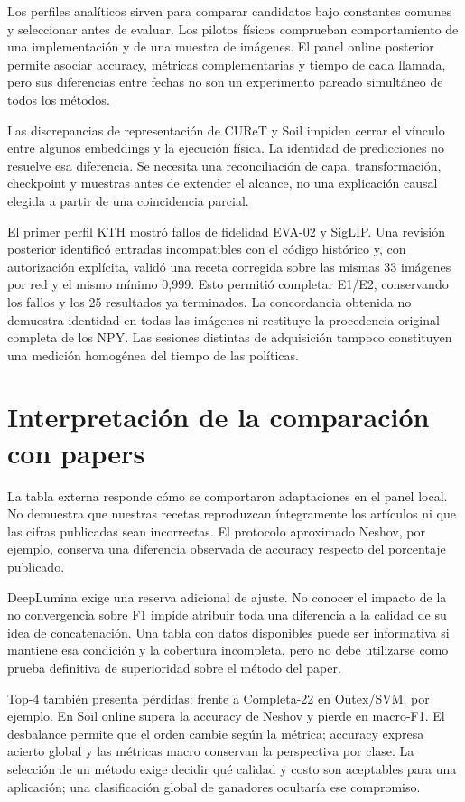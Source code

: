 Los perfiles analíticos sirven para comparar candidatos bajo constantes comunes y seleccionar antes de evaluar. Los pilotos físicos comprueban comportamiento de una implementación y de una muestra de imágenes. El panel online posterior permite asociar accuracy, métricas complementarias y tiempo de cada llamada, pero sus diferencias entre fechas no son un experimento pareado simultáneo de todos los métodos.

Las discrepancias de representación de CUReT y Soil impiden cerrar el vínculo entre algunos embeddings y la ejecución física. La identidad de predicciones no resuelve esa diferencia. Se necesita una reconciliación de capa, transformación, checkpoint y muestras antes de extender el alcance, no una explicación causal elegida a partir de una coincidencia parcial.

El primer perfil KTH mostró fallos de fidelidad EVA-02 y SigLIP. Una revisión posterior identificó entradas incompatibles con el código histórico y, con autorización explícita, validó una receta corregida sobre las mismas 33 imágenes por red y el mismo mínimo 0,999. Esto permitió completar E1/E2, conservando los fallos y los 25 resultados ya terminados. La concordancia obtenida no demuestra identidad en todas las imágenes ni restituye la procedencia original completa de los NPY. Las sesiones distintas de adquisición tampoco constituyen una medición homogénea del tiempo de las políticas.

\section{Interpretación de la comparación con papers}
La tabla externa responde cómo se comportaron adaptaciones en el panel local. No demuestra que nuestras recetas reproduzcan íntegramente los artículos ni que las cifras publicadas sean incorrectas. El protocolo aproximado Neshov, por ejemplo, conserva una diferencia observada de accuracy respecto del porcentaje publicado.

DeepLumina exige una reserva adicional de ajuste. No conocer el impacto de la no convergencia sobre F1 impide atribuir toda una diferencia a la calidad de su idea de concatenación. Una tabla con datos disponibles puede ser informativa si mantiene esa condición y la cobertura incompleta, pero no debe utilizarse como prueba definitiva de superioridad sobre el método del paper.

Top-4 también presenta pérdidas: frente a Completa-22 en Outex/SVM, por ejemplo. En Soil online supera la accuracy de Neshov y pierde en macro-F1. El desbalance permite que el orden cambie según la métrica; accuracy expresa acierto global y las métricas macro conservan la perspectiva por clase. La selección de un método exige decidir qué calidad y costo son aceptables para una aplicación; una clasificación global de ganadores ocultaría ese compromiso.


